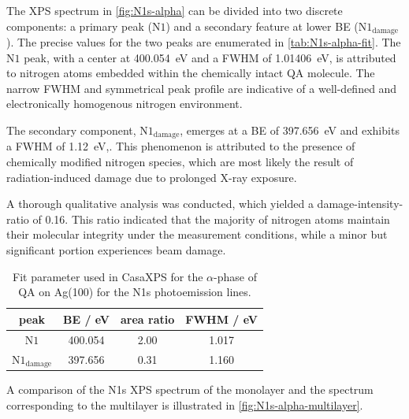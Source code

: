 The \ac{XPS} spectrum in \autoref{fig:N1s-alpha} can be divided into two discrete components: a primary peak ($\mathrm{N1}$) and a secondary feature at lower \ac{BE} ($\mathrm{N1_{damage}}$). The precise values for the two peaks are enumerated in \autoref{tab:N1s-alpha-fit}. The $\mathrm{N1}$ peak, with a center at 400.054~\si{\eV} and a \ac{FWHM} of 1.01406~\si{\eV}, is attributed to nitrogen atoms embedded within the chemically intact \ac{QA} molecule. The narrow \ac{FWHM} and symmetrical peak profile are indicative of a well-defined and electronically homogenous nitrogen environment.

The secondary component, $\mathrm{N1_{damage}}$, emerges at a \ac{BE} of 397.656~\si{\eV} and exhibits a \ac{FWHM} of 1.12~\si{\eV},. This phenomenon is attributed to the presence of chemically modified nitrogen species, which are most likely the result of radiation-induced damage due to prolonged X-ray exposure.

A thorough qualitative analysis was conducted, which yielded a damage-intensity-ratio of 0.16. This ratio indicated that the majority of nitrogen atoms maintain their molecular integrity under the measurement conditions, while a minor but significant portion experiences beam damage.

\begin{table}[H]
	\centering
	\caption{Fit parameter used in CasaXPS\autocite{CasaSoftwareLtd2022} for the $\alpha$-phase of \ac{QA} on Ag(100) for the N1s photoemission lines.}
	\begin{tabular}{|c|c|c|c|}
		\hline
		peak & \ac{BE} / eV & area ratio & FWHM / eV \\
		\hline
		$\mathrm{N1}$ & 400.054 & 2.00 & 1.017 \\ \hline
		$\mathrm{N1_{damage}}$ & 397.656 & 0.31 & 1.160 \\ \hline
	\end{tabular}
	\label{tab:N1s-alpha-fit}
\end{table}

A comparison of the N1s \ac{XPS} spectrum of the monolayer and the spectrum corresponding to the multilayer is illustrated in \autoref{fig:N1s-alpha-multilayer}.

